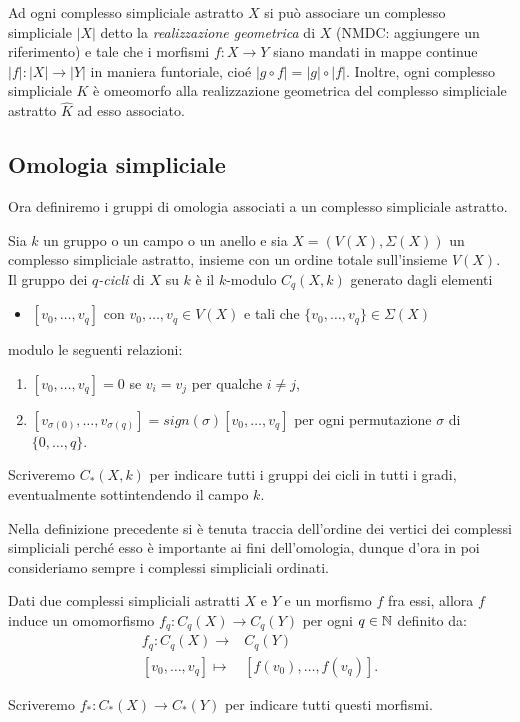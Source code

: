 Ad ogni complesso simpliciale astratto $X$ si può associare un complesso simpliciale $|X|$ detto la \emph{realizzazione geometrica} di $X$ (NMDC: aggiungere un riferimento) e tale che i morfismi $f:X\to Y$ siano mandati in mappe continue $|f|:|X|\to |Y|$ in maniera funtoriale, cioé $|g\circ f|=|g|\circ |f|$. Inoltre, ogni complesso simpliciale $K$ è omeomorfo alla realizzazione geometrica del complesso simpliciale astratto $\widehat{K}$ ad esso associato.

\subsection{Omologia simpliciale}

Ora definiremo i gruppi di omologia associati a un complesso simpliciale astratto.

\begin{defn}
  Sia $k$ un gruppo o un campo o un anello e
  sia $X=(V(X),\Sigma(X))$ un complesso simpliciale astratto, insieme con un ordine totale sull'insieme $V(X)$. Il gruppo dei \emph{$q$-cicli} di $X$ su $k$ è il $k$-modulo $C_q(X,k)$ generato dagli elementi
  \begin{itemize}
    \item $[v_0,\dots, v_q]$ con $v_0,\dots, v_q\in V(X)$ e tali che $\{v_0,\dots,v_q\}\in\Sigma(X)$
  \end{itemize}
  modulo le seguenti relazioni:
  \begin{enumerate}
    \item $[v_0,\dots,v_q]=0$ se $v_i = v_j$ per qualche $i\neq j$,
    \item $[v_{\sigma(0)},\dots,v_{\sigma(q)}]=sign(\sigma)[v_0,\dots,v_q]$ per ogni permutazione $\sigma$ di $\{0,\dots,q\}$.
  \end{enumerate}

  Scriveremo $C_*(X,k)$ per indicare tutti i gruppi dei cicli in tutti i gradi, eventualmente sottintendendo il campo $k$.
\end{defn}

\begin{rmk}
  Nella definizione precedente si è tenuta traccia dell'ordine dei vertici dei complessi simpliciali perché esso è importante ai fini dell'omologia, dunque d'ora in poi consideriamo sempre i complessi simpliciali ordinati.
\end{rmk}

\begin{lemma}\label{lemma:sollcicli}
  Dati due complessi simpliciali astratti $X$ e $Y$ e un morfismo $f$ fra essi, allora $f$ induce un omomorfismo $f_q:C_q(X)\to C_q(Y)$ per ogni $q\in\mathbb{N}$ definito da:
  \begin{align*}
    f_q:C_q(X)\longrightarrow & C_q(Y)\\
    [v_0,\dots,v_q] \mapsto & [f(v_0),\dots,f(v_q)].
  \end{align*}

  Scriveremo $f_*:C_*(X)\to C_*(Y)$ per indicare tutti questi morfismi.
\end{lemma}

